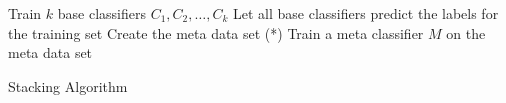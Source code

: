 \begin{algorithm}[H]
	\DontPrintSemicolon
	\footnotesize
	Train $k$ base classifiers $C_1, C_2, \dots, C_k$\;
	Let all base classifiers predict the labels for the training set\;
	Create the meta data set (*)\;
	Train a meta classifier $M$ on the meta data set\;
 	\caption{Stacking Algorithm}
\end{algorithm}